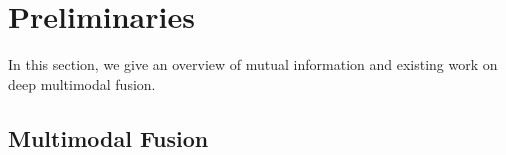 \documentclass[letterpaper]{article} %
\begin{document}














\section{Preliminaries}
In this section, we give an overview of mutual information and existing work on deep multimodal fusion.

\subsection{Multimodal Fusion}
\end{document}
